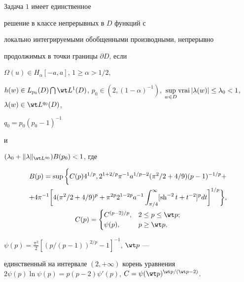 \begin{thm}


Задача $1$ имеет единственное


решение в классе непрерывных в $D$ функций с


локально интегрируемыми обобщенными производными, непрерывно


продолжимых в точки границы $\partial D $, если





$\Omega(u) \in


H_{\alpha}[-a, a]$, $1 \geq \alpha > 1/2$,


$h(w) \in L_{p_0}(D) \bigcap \wt L^1 (D)$, $p_0 \in (2, (1 -


\alpha)^{-1})$, $\sup\limits_{w \in D} \vrai


|\lambda(w)| \leq \lambda_0 < 1$, $\lambda(w) \in \wt L^{q_0}(D)$,


$q_0 = p_0(p_0 - 1)^{-1}$


и


$(\lambda_0 +\|\lambda\|_{\wt L^{q_0}}) B(p_0) < 1$, где


\begin{gather}


B(p) = \sup \bigg\{ C(p) 4^{1/p}, 2^{1 + 2/p} \pi^{-1} a^{1/p - 2}


(\pi^2/2 + 4/9) (p - 1)^{-1/p} +\notag \\


%


+ 4 \pi^{-1} \bigg[ 4(\pi^2/2 + 4/9)^p +


\pi^{2p} 2^{1 - 2p} a^{-1} \int_{\pi/4}^{\infty}


[\sh^{-2}t + t^{-2}]^p dt \bigg]^{1/p} \bigg\}, \\


%


C(p) =


\begin{cases}


C^{(p-2)/p}, & 2 \leq p \leq \wt p;\\


\psi(p), & p \geq \wt p,


\end{cases} \notag


\end{gather}


$\psi(p) = \frac{\pi^2}{2}[(p/(p-1))^{2/p} - 1]^{-1}$, $\wt p $ ---


единственный на интервале $(2, + \infty)$ корень уравнения $2\psi(p)


\ln \psi(p) = p(p-2) \psi'(p)$, $C = \psi(\wt p)^{\wt p/(\wt p - 2)}$.


\end{thm}






